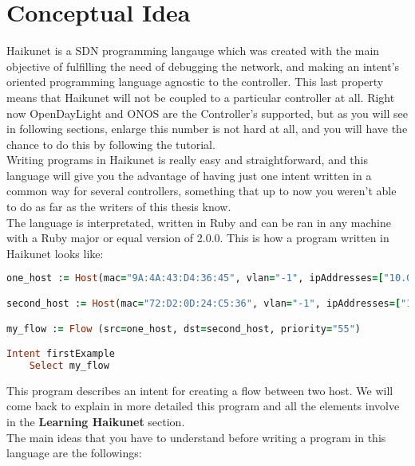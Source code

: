 \section{Conceptual Idea}

Haikunet is a SDN programming langauge which was created with the main objective of fulfilling the need of debugging the network, and making an intent's oriented programming language agnostic to the controller. This last property means that Haikunet will not be coupled to a particular controller at all. Right now OpenDayLight and ONOS are the Controller's supported, but as you will see in following sections, enlarge this number is not hard at all, and you will have the chance to do this by following the tutorial.\\
Writing programs in Haikunet is really easy and straightforward, and this language will give you the advantage of having just one intent written in a common way for several controllers, something that up to now you weren't able to do as far as the writers of this thesis know.\\
The language is interpretated, written in Ruby and can be ran in any machine with a Ruby major or equal version of 2.0.0. This is how a program written in Haikunet looks like:

\begin{lstlisting}[language=Ruby,breaklines=true]
one_host := Host(mac="9A:4A:43:D4:36:45", vlan="-1", ipAddresses=["10.0.0.1"], elementId="of:0000000000000002", port="4")

second_host := Host(mac="72:D2:0D:24:C5:36", vlan="-1", ipAddresses=["10.0.0.4"], elementId="of:0000000000000003", port="4")

my_flow := Flow (src=one_host, dst=second_host, priority="55")

Intent firstExample
	Select my_flow
\end{lstlisting}

This program describes an intent for creating a flow between two host. We will come back to explain in more detailed this program and all the elements involve in the \textbf{Learning Haikunet} section.\\

The main ideas that you have to understand before writing a program in this language are the followings:

